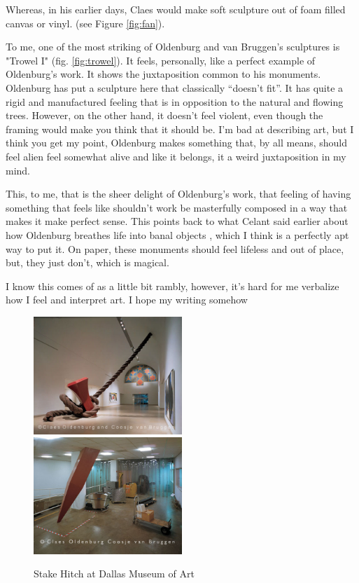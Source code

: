 \documentclass[12pt]{article}
\begin{document}
    Whereas, in his earlier days, Claes would make soft sculpture out of foam filled canvas or vinyl. (see Figure \ref{fig:fan}).
\par To me, one of the most striking of Oldenburg and van Bruggen's sculptures is "Trowel I" (fig. \ref{fig:trowel}). It feels, personally, like a perfect example of Oldenburg's work. It shows the juxtaposition common to his monuments. Oldenburg has put a sculpture here that classically ``doesn't fit''.
    It has quite a rigid and manufactured feeling that is in opposition to the natural and flowing trees. However, on the other hand, it doesn't feel violent, even though the framing would make you think that it should be. I'm bad at describing art, but I think you get my point, Oldenburg makes something that, by all means, should feel alien feel somewhat alive and like it belongs, it a weird juxtaposition in my mind.
\par This, to me, that is the sheer delight of Oldenburg's work, that feeling of having something that feels like shouldn't work be masterfully composed in a way that makes it make perfect sense. This points back to what Celant said earlier about how Oldenburg breathes life into banal objects \autocite{bio3}, which I think is a perfectly apt way to put it. On paper, these monuments should feel lifeless and out of place, but, they just don't, which is magical.
\par I know this comes of as a little bit rambly, however, it's hard for me verbalize how I feel and interpret art. I hope my writing somehow  


\newpage

\begin{figure}[t]
    \includegraphics[width=0.5\textwidth,height=0.4\textheight]{stake1.jpg}
    \includegraphics[width=0.5\textwidth,height=0.4\textheight]{stake2.jpeg}
    \caption{Stake Hitch at Dallas Museum of Art \autocite{Pic1}}
    \label{fig:stake}
\end{figure}
\end{document}
